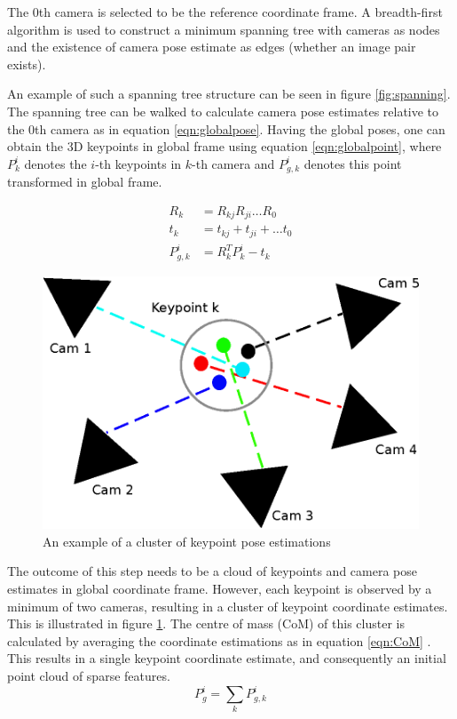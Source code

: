 \documentclass[10pt,twocolumn,letterpaper]{article}
\begin{document}
The 0th camera is selected to be the reference coordinate frame. A breadth-first
algorithm is used to construct a minimum spanning tree with cameras as nodes and
the existence of camera pose estimate as edges (whether an image pair exists).

An example of such a spanning tree structure can be seen in figure
\ref{fig:spanning}. 
The spanning tree can be walked to calculate camera pose estimates relative to
the 0th camera as in equation \ref{eqn:globalpose}. Having the global poses, one can obtain the 3D keypoints in global frame using equation \ref{eqn:globalpoint}, where $P^{i}_{k}$ denotes the $i$-th keypoints in $k$-th camera and $P^{i}_{g,k}$ denotes this point transformed in global frame.

\begin{align}\label{eqn:globalpose}
R_{k} &= R_{kj}R_{ji}\ldots R_{0}\nonumber\\
t_{k} &= t_{kj}+t_{ji}+\ldots t_{0}\\
P^{i}_{g,k} &= R_{k}^T P^{i}_{k} - t_{k} \label{eqn:globalpoint}
\end{align}

\begin{figure}[t]
\begin{center}
   \includegraphics[width=0.9\linewidth]{figures/clusters.eps}
\end{center}
\caption{An example of a cluster of keypoint pose estimations}
\label{fig:clusters}
\end{figure}

The outcome of this step needs to be a cloud of keypoints and camera pose
estimates in global coordinate frame. However, each keypoint is observed by a
minimum of two cameras, resulting in a cluster of keypoint coordinate estimates.
This is illustrated in figure \ref{fig:clusters}.
The centre of mass (CoM) of this cluster is calculated by averaging the
coordinate estimations as in equation \ref{eqn:CoM} \cite{reckerdepth}. This results in a single keypoint coordinate estimate,
and consequently an initial point cloud of sparse features.
\begin{equation}\label{eqn:CoM}
P^{i}_{g} = \sum_{k}{P^{i}_{g,k}}
\end{equation}
\end{document}

